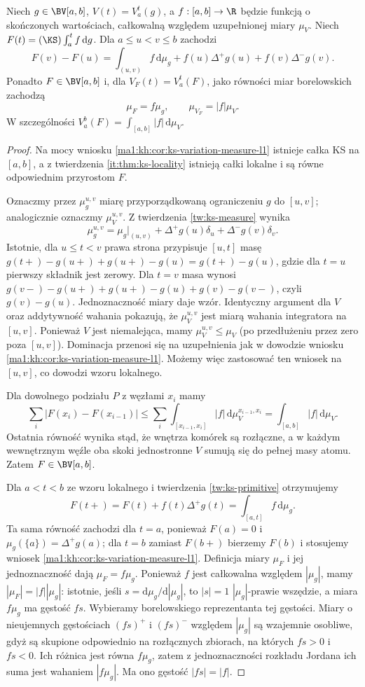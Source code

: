 \begin{twierdzenie}
\label{it:thm:ks-primitive-variation-exact}
Niech $g\in\BV[a,b]$, $V(t)=V_a^t(g)$, a $f:[a,b]\to\R$ będzie funkcją o skończonych wartościach, całkowalną względem uzupełnionej miary $\mu_V$. Niech
$F(t)=(\KS)\int_a^t f\,\mathrm dg$. Dla $a\le u<v\le b$ zachodzi
\[
 F(v)-F(u)=\int_{(u,v)} f\,\mathrm d\mu_g
 +f(u)\Delta^+g(u)+f(v)\Delta^-g(v).
\]
Ponadto $F\in\BV[a,b]$ i, dla $V_F(t)=V_a^t(F)$, jako równości miar borelowskich zachodzą
\[
 \mu_F=f\mu_g,\qquad \mu_{V_F}=|f|\mu_V.
\]
W szczególności $V_a^b(F)=\int_{[a,b]}|f|\,\mathrm d\mu_V$.
\end{twierdzenie}
\begin{proof}
Na mocy wniosku \ref{ma1:kh:cor:ks-variation-measure-l1}
istnieje całka KS na $[a,b]$, a z twierdzenia
\ref{it:thm:ks-locality} istnieją całki lokalne i są równe
odpowiednim przyrostom $F$.

Oznaczmy przez $\mu_g^{u,v}$ miarę przyporządkowaną
ograniczeniu $g$ do $[u,v]$; analogicznie oznaczmy
$\mu_V^{u,v}$. Z twierdzenia \ref{tw:ks-measure} wynika
\[
 \mu_g^{u,v}=\mu_g|_{(u,v)}
 +\Delta^+g(u)\delta_u+\Delta^-g(v)\delta_v .
\]
Istotnie, dla $u\le t<v$ prawa strona przypisuje
$[u,t]$ masę $g(t+)-g(u+)+g(u+)-g(u)=g(t+)-g(u)$,
gdzie dla $t=u$ pierwszy składnik jest zerowy. Dla $t=v$
masa wynosi $g(v-)-g(u+)+g(u+)-g(u)+g(v)-g(v-)$,
czyli $g(v)-g(u)$. Jednoznaczność miary daje wzór.
Identyczny argument dla $V$ oraz addytywność wahania
pokazują, że $\mu_V^{u,v}$ jest miarą wahania integratora
na $[u,v]$. Ponieważ $V$ jest niemalejąca, mamy
$\mu_V^{u,v}\le \mu_V$ (po przedłużeniu przez zero poza
$[u,v]$). Dominacja przenosi się na uzupełnienia jak w
dowodzie wniosku \ref{ma1:kh:cor:ks-variation-measure-l1}.
Możemy więc zastosować ten wniosek na $[u,v]$, co
dowodzi wzoru lokalnego.

Dla dowolnego podziału $P$ z węzłami $x_i$ mamy
\[
 \sum_i|F(x_i)-F(x_{i-1})|
 \le\sum_i\int_{[x_{i-1},x_i]}|f|\,\mathrm d\mu_V^{x_{i-1},x_i}
 =\int_{[a,b]}|f|\,\mathrm d\mu_V.
\]
Ostatnia równość wynika stąd, że wnętrza komórek są
rozłączne, a w każdym wewnętrznym węźle oba skoki
jednostronne $V$ sumują się do pełnej masy atomu.
Zatem $F\in\BV[a,b]$.

Dla $a<t<b$ ze wzoru lokalnego i twierdzenia
\ref{tw:ks-primitive} otrzymujemy
\[
 F(t+)=F(t)+f(t)\Delta^+g(t)
 =\int_{[a,t]} f\,\mathrm d\mu_g .
\]
Ta sama równość zachodzi dla $t=a$, ponieważ $F(a)=0$
i $\mu_g(\{a\})=\Delta^+g(a)$; dla $t=b$ zamiast
$F(b+)$ bierzemy $F(b)$ i stosujemy wniosek
\ref{ma1:kh:cor:ks-variation-measure-l1}.
Definicja miary $\mu_F$ i jej jednoznaczność dają
$\mu_F=f\mu_g$. Ponieważ $f$ jest całkowalna względem
$|\mu_g|$, mamy $|\mu_F|=|f||\mu_g|$: istotnie, jeśli
$s=\mathrm d\mu_g/\mathrm d|\mu_g|$, to $|s|=1$
$|\mu_g|$-prawie wszędzie, a miara $f\mu_g$ ma gęstość
$fs$. Wybieramy borelowskiego reprezentanta tej gęstości.
Miary o nieujemnych gęstościach $(fs)^+$ i $(fs)^-$
względem $|\mu_g|$ są wzajemnie osobliwe, gdyż są
skupione odpowiednio na rozłącznych zbiorach, na których
$fs>0$ i $fs<0$. Ich różnica jest równa $f\mu_g$,
zatem z jednoznaczności rozkładu Jordana ich suma jest
wahaniem $|f\mu_g|$. Ma ono gęstość $|fs|=|f|$.


\end{proof}
